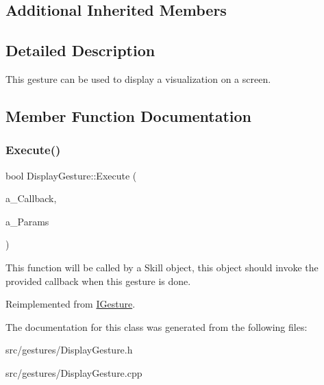 \subsection*{Additional Inherited Members}


\subsection{Detailed Description}
This gesture can be used to display a visualization on a screen. 

\subsection{Member Function Documentation}
\mbox{\label{class_display_gesture_a85bd298434073aa8d384ccbf520ef221}} 
\subsubsection{\texorpdfstring{Execute()}{Execute()}}
{\footnotesize\ttfamily bool Display\+Gesture\+::\+Execute (\begin{DoxyParamCaption}\item[{Gesture\+Delegate}]{a\+\_\+\+Callback,  }\item[{const \hyperlink{class_params_map}{Params\+Map} \&}]{a\+\_\+\+Params }\end{DoxyParamCaption})\hspace{0.3cm}{\ttfamily [virtual]}}

This function will be called by a Skill object, this object should invoke the provided callback when this gesture is done. 

Reimplemented from \hyperlink{class_i_gesture_aa48e38eda852843cab78c22dabfe7371}{I\+Gesture}.



The documentation for this class was generated from the following files\+:\begin{DoxyCompactItemize}
\item 
src/gestures/Display\+Gesture.\+h\item 
src/gestures/Display\+Gesture.\+cpp\end{DoxyCompactItemize}

